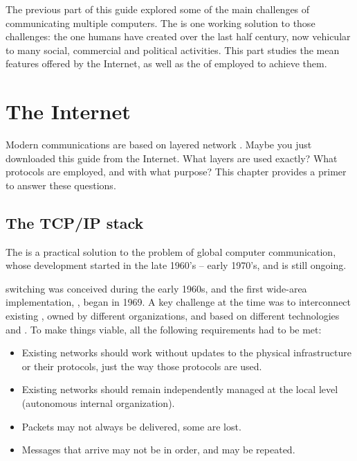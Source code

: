 The previous part of this guide explored some of the main challenges of communicating multiple computers.
The  is one working solution to those challenges: the one humans have created over the last half century,
now vehicular to many social, commercial and political activities. 
% 
This part studies the mean features offered by the Internet, as well as the  of  
employed to achieve them.


\chapter{The Internet}\label{sec:internet}

Modern communications are based on layered network . 
Maybe you just downloaded this guide from the Internet.
% 
What layers are used exactly? What protocols are employed, and with what purpose?
% 
This chapter provides a primer to answer these questions.\\[-1cm]

\section{The TCP/IP stack}


The  is a practical solution to the problem of global computer communication,
whose development started in the late 1960's -- early 1970's, and is still ongoing.

 switching was conceived during the early 1960s, and the first 
wide-area implementation, , began in 1969. 
% 
A key challenge at the time was to interconnect existing , 
owned by different organizations, and based on different technologies and .
% 
To make things viable, all the following requirements had to be met:
\begin{itemize}
    \item Existing networks should work without updates to the physical infrastructure 
      or their protocols, just the way those protocols are used.
    \item Existing networks should remain independently managed at the local level (autonomous internal organization).
    \item Packets may not always be delivered, some are lost.
    \item Messages that arrive may not be in order, and may be repeated.
\end{itemize}

